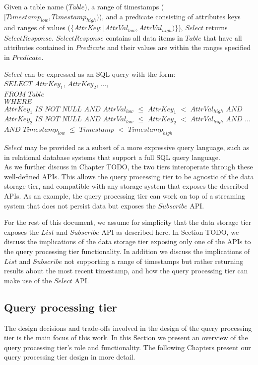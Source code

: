Given a table name ($Table$), a range of timestamps ($[Timestamp_{low}, Timestamp_{high})$), and
a predicate consisting of attributes keys and ranges of values
($\{AttrKey: [AttrVal_{low}, AttrVal_{high})\}$), $Select$ returns $SelectResponse$.
$SelectResponse$ contains all data items in $Table$ that have all attributes contained in $Predicate$ and
their values are within the ranges specified in $Predicate$.

$Select$ can be expressed as an SQL query with the form: \\
\noindent
$SELECT$ $AttrKey_1$, $AttrKey_2$, ..., \\
$FROM$ $Table$ \\
$WHERE$ \\
$AttrKey_1$ $IS$ $NOT$ $NULL$ $AND$ $AttrVal_{low}$ $\leq$ $AttrKey_1$ $<$ $AttrVal_{high}$
$AND$ $AttrKey_2$ $IS$ $NOT$ $NULL$ $AND$ $AttrVal_{low}$ $\leq$ $AttrKey_2$ $<$ $AttrVal_{high}$
$AND$ ... \\
$AND$ $Timestamp_{low}$ $\leq$ $Timestamp$ $<$ $Timestamp_{high}$

$Select$ may be provided as a subset of a more expressive query language, such as in relational database
systems that support a full SQL query language. \\

\noindent
As we further discuss in Chapter
TODO,
the two tiers interoperate through these well-defined APIs.
This allows the query processing tier to be agnostic of the data storage tier, and compatible with any storage system
that exposes the described APIs.
As an example, the query processing tier can work on top of a streaming system that does not persist data but exposes
the $Subscribe$ API.

For the rest of this document, we assume for simplicity that the data storage tier exposes the $List$ and $Subscribe$
API as described here.
In Section
TODO,
we discuss the implications of the data storage tier exposing only one of the APIs to the query processing tier
functionality.
In addition we discuss the implications of $List$ and $Subscribe$ not supporting a range of timestamps but rather
returning results about the most recent timestamp, and how the query processing tier can make use of the $Select$ API.

\subsection{Query processing tier}
\label{subsec:query_prcessing_tier}
The design decisions and trade-offs involved in the design of the query processing tier is the main focus of this work.
In this Section we present an overview of the query processing tier's role and functionality.
The following Chapters present our query processing tier design in more detail.


